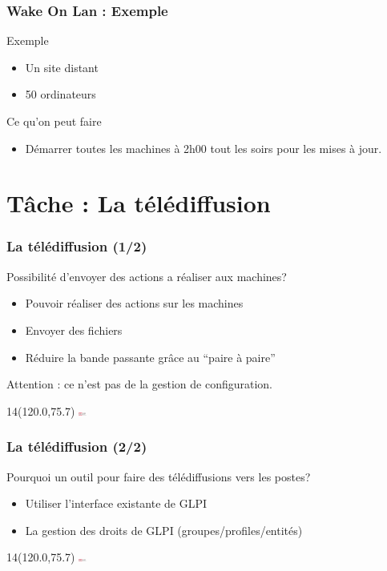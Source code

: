 \documentclass{beamer}
\newcommand{\WorkInProgress}{%
\begin{textblock}{14}(120.0,75.7)
\includegraphics[height=0.1cm]{./pics/logo_owf.png}
\end{textblock}
  }
\begin{document}
\begin{frame}
    \frametitle{Wake On Lan : Exemple}

    \begin{block}{Exemple}
    \begin{itemize}
    \item Un site distant
    \item 50 ordinateurs
    \end{itemize}
    \end{block}


    \begin{block}{Ce qu'on peut faire}
    \begin{itemize}
    \item Démarrer toutes les machines à 2h00 tout les soirs pour les mises à jour.
    \end{itemize}
    \end{block}

\end{frame}


\section{Tâche : La télédiffusion}

\begin{frame}
    \frametitle{La télédiffusion (1/2)}

    \begin{block}{Possibilité d'envoyer des actions a réaliser aux machines?}
    \begin{itemize}
        \item Pouvoir réaliser des actions sur les machines
        \item Envoyer des fichiers
        \item Réduire la bande passante grâce au “paire à paire”
    \end{itemize}
    Attention : ce n'est pas de la gestion de configuration.
    \end{block}

\WorkInProgress
\end{frame}

\begin{frame}
    \frametitle{La télédiffusion (2/2)}

    \begin{block}{Pourquoi un outil pour faire des télédiffusions vers les postes?}
    \begin{itemize}
        \item Utiliser l'interface existante de GLPI
        \item La gestion des droits de GLPI (groupes/profiles/entités)
    \end{itemize}
    \end{block}

\WorkInProgress
\end{frame}
\end{document}
